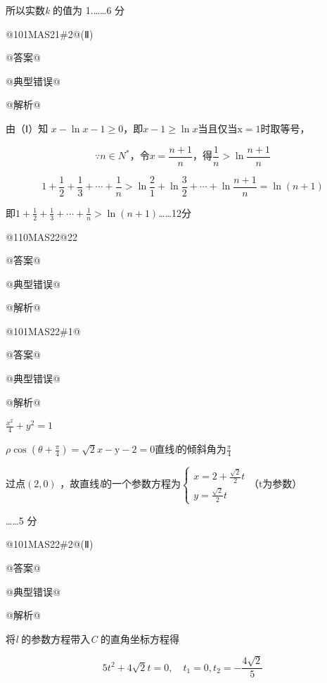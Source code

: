\documentclass{scrbook}
\begin{document}
所以实数\textit{k} 的值为 1.{\ldots}{\ldots}6 分

@101MA{\textbar}S21\#2@(Ⅱ)

@答案@

@典型错误@

@解析@

由（Ⅰ）知 $x- \ln x- 1\geq 0$，即$x- 1\geq \ln x$当且仅当$\mathrm{x}=1$时取等号，

\begin{equation*}
\because n\in N^{*}，\mathrm{令}x=\frac{n+1}{n}，\mathrm{得}\frac{1}{n}>\ln \frac{n+1}{n}
\end{equation*}

\begin{equation*}
1+\frac{1}{2}+\frac{1}{3}+\cdots +\frac{1}{n}>\ln \frac{2}{1}+\ln \frac{3}{2}+\cdots +\ln \frac{n+1}{n}=\ln (n+1)
\end{equation*}

即$1+\frac{1}{2}+\frac{1}{3}+\cdots +\frac{1}{n}>\ln (n+1)${\ldots}{\ldots}12分

@110MA{\textbar}S22@22

@答案@

@典型错误@

@解析@

@101MA{\textbar}S22\#1@\raisebox{-2.5pt}{（Ⅰ）}

@答案@

@典型错误@

@解析@

\raisebox{-2.5pt}{解： C 的直角坐标方程为}$\frac{x^{2}}{4}+y^{2}=1$

\raisebox{-2.5pt}{由}$\rho \cos \left(\theta +\frac{\pi }{4}\right)=\sqrt{2}$\raisebox{-2.5pt}{得}$x-\mathrm{y}-2=0$\raisebox{-2.5pt}{，}直线\textit{l}的倾斜角为$\frac{\pi }{4}$

过点$(2,0)$ ，故直线\textit{l}的一个参数方程为$\left\{\begin{array}{l}
x=2+\frac{\sqrt{2}}{2}t\\
y=\frac{\sqrt{2}}{2}t
\end{array}\right.$（$\mathrm{t}$为参数）

{\ldots}{\ldots}5 分

@101MA{\textbar}S22\#2@(Ⅱ)

@答案@

@典型错误@

@解析@

将\textit{l} 的参数方程带入\textit{C} 的直角坐标方程得

\begin{equation*}
5t^{2}+4\sqrt{2}t=0,{\quad} t_{1}=0,t_{2}=- \frac{4\sqrt{2}}{5}
\end{equation*}
\end{document}
